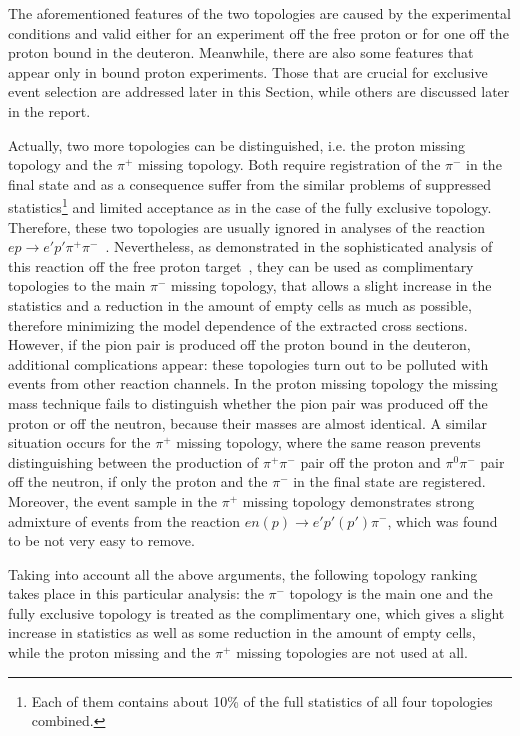 The aforementioned features of the two topologies are caused by the experimental conditions and valid either for an experiment off the free proton or for one off the proton bound in the deuteron. Meanwhile, there are also some features that appear only in bound proton experiments. Those that are crucial for exclusive event selection are addressed later in this Section, while others are discussed later in the report.%

Actually, two more topologies can be distinguished, i.e. the proton missing topology and the $\pi^{+}$ missing topology. Both require registration of the $\pi^{-}$ in the final state and as a consequence suffer from the similar problems of suppressed statistics\footnote[9]{Each of them contains about 10\% of the full statistics of all four topologies combined.} and limited acceptance as in the case of the fully exclusive topology.  Therefore, these two topologies are usually ignored in analyses of the reaction $ep\rightarrow{}e'p'\pi^{+}\pi^{-}$~\cite{Rip_an_note:2002,Ripani:2002ss,Fed_an_note:2007,Fedotov:2008aa,Isupov:2017lnd}. Nevertheless, as demonstrated in the sophisticated analysis of this reaction off the free proton target~\cite{Fed_an_note:2017,Fed_paper_2018}, they can be used as complimentary topologies to the main $\pi^{-}$ missing topology, that allows a slight increase in the statistics and a reduction in the amount of empty cells as much as possible, therefore minimizing the model dependence of the extracted cross sections. However, if the pion pair is produced off the proton bound in the deuteron, additional complications appear: these topologies turn out to be polluted with events from other reaction channels. In the proton missing topology the missing mass technique fails to distinguish whether the pion pair was produced off the proton or off the neutron, because their masses are almost identical. A similar situation occurs for the $\pi^+$ missing topology, where the same reason prevents distinguishing between the production of $\pi^{+}\pi^{-}$ pair off the proton and $\pi^{0}\pi^{-}$ pair off the neutron, if only the proton and the $\pi^{-}$ in the final state are registered. Moreover, the event sample in the $\pi^+$ missing topology demonstrates strong admixture of events from the reaction $en(p)\rightarrow e'p'(p')\pi^{-}$, which was found to be not very easy to remove.
 
Taking into account all the above arguments, the following topology ranking takes place in this particular analysis: the $\pi^{-}$ topology is the main one and the fully exclusive topology is treated as the complimentary one, which gives a slight increase in statistics as well as some reduction in the amount of empty cells, while the proton missing and the $\pi^{+}$ missing topologies are not used at all.

